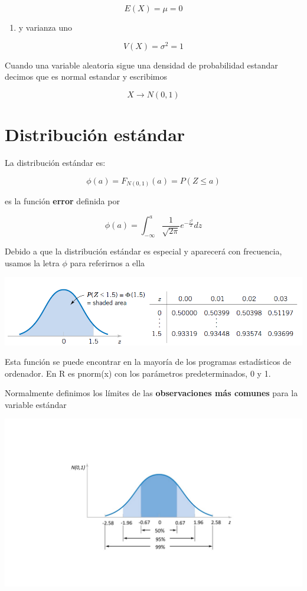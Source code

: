 \documentclass[
]{book}
\providecommand{\tightlist}{%
  \setlength{\itemsep}{0pt}\setlength{\parskip}{0pt}}
\begin{document}
\[E(X)= \mu = 0\]

\begin{enumerate}
\def\labelenumi{\arabic{enumi})}
\setcounter{enumi}{1}
\tightlist
\item
  y varianza uno
\end{enumerate}

\[V (X)= \sigma^2 =1\]

Cuando una variable aleatoria sigue una densidad de probabilidad estandar decimos que es normal estandar y escribimos

\[X \rightarrow N(0,1)\]

\hypertarget{distribuciuxf3n-estuxe1ndar}{%
\section{Distribución estándar}\label{distribuciuxf3n-estuxe1ndar}}

La distribución estándar es:

\[\phi(a)=F_{N(0,1)}(a)=P(Z \leq a)\]

es la función \textbf{error} definida por

\[\phi(a)=\int_{-\infty}^{a} \frac{1}{\sqrt{2\pi}}e^{-\frac{z^2}{2}} dz\]

Debido a que la distribución estándar es especial y aparecerá con frecuencia, usamos la letra \(\phi\) para referirnos a ella

\includegraphics{./figures/st.png}

Esta función se puede encontrar en la mayoría de los programas estadísticos de ordenador. En R es pnorm(x) con los parámetros predeterminados, 0 y 1.

Normalmente definimos los límites de las \textbf{observaciones más comunes} para la variable estándar

\includegraphics{./figures/phi.JPG}
\end{document}
